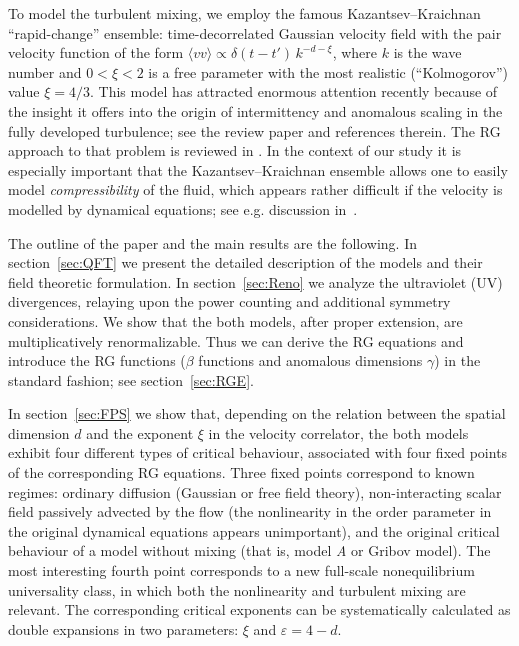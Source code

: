 \documentclass[12pt]{iopart}
\begin{document}
To model the turbulent mixing, we employ the famous Kazantsev--Kraichnan
``rapid-change'' ensemble: time-decorrelated Gaussian velocity field
with the pair velocity function of the form
$\langle vv\rangle \propto \delta(t-t') \, k^{-d-\xi}$, where
$k$ is the wave number and $0<\xi<2$ is a free parameter with the most
realistic (``Kolmogorov'') value $\xi=4/3$.
This model has attracted enormous attention recently because of the insight
it offers into the origin of intermittency and anomalous scaling in the
fully developed turbulence; see the review paper \cite{FGV} and references
therein. The RG approach to that problem is reviewed in \cite{JphysA}.
In the context of our study it is especially important that the
Kazantsev--Kraichnan ensemble allows one to easily model
{\it compressibility} of the fluid, which appears rather difficult
if the velocity is modelled by dynamical equations; see e.g.
discussion in~\cite{Compress}.


The outline of the paper and the main results are the following.
In section~\ref{sec:QFT} we present the detailed description of the models
and their field theoretic formulation.
In section~\ref{sec:Reno} we analyze the ultraviolet (UV) divergences,
relaying upon the power counting and additional symmetry considerations.
We show that the both models, after proper extension,
are multiplicatively renormalizable. Thus we can derive the RG equations
and introduce the RG functions ($\beta$ functions and anomalous dimensions
$\gamma$) in the standard fashion; see section~\ref{sec:RGE}.

In section~\ref{sec:FPS} we show that, depending on the relation between
the spatial dimension $d$ and the exponent $\xi$ in
the velocity correlator, the both models exhibit four different types of
critical behaviour, associated with four fixed points of the corresponding
RG equations. Three fixed points correspond to known regimes:
ordinary diffusion (Gaussian or free field theory), non-interacting
scalar field passively advected by the flow (the nonlinearity in the order
parameter in the original dynamical equations appears unimportant),
and the original critical behaviour of a model without mixing (that is,
model {\it A} or Gribov model). The most interesting fourth point corresponds
to a new full-scale nonequilibrium universality class, in which both
the nonlinearity and turbulent mixing are relevant. The corresponding
critical exponents can be systematically calculated as double expansions
in two parameters: $\xi$ and $\varepsilon=4-d$.
\end{document}
